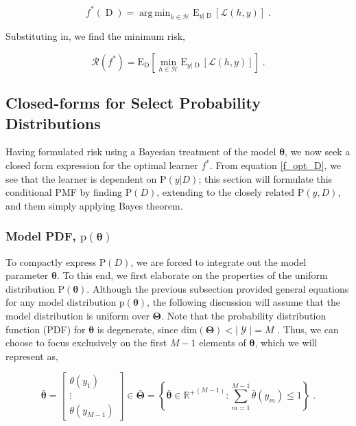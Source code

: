 \documentclass[12pt]{report}
\DeclareMathOperator*{\argmin}{arg\,min}
\DeclareMathOperator{\Drm}{\mathrm{D}}
\DeclareMathOperator{\Ycal}{\mathcal{Y}}
\begin{document}
\begin{equation} \label{f_opt_D}
f^*(\Drm) = \argmin_{h \in \mathcal{H}} \text{E}_{y|\Drm}\left[ \mathcal{L}(h,y) \right] \;.
\end{equation}

Substituting in, we find the minimum risk,

\begin{equation} \label{risk_min}
\mathcal{R}(f^*) = \text{E}_{\Drm} \left[ \min_{h \in \mathcal{H}} \text{E}_{y|\Drm}\left[ \mathcal{L}(h,y) \right] \right] \;.
\end{equation}




\subsection{Closed-forms for Select Probability Distributions}

Having formulated risk using a Bayesian treatment of the model $\bm{\theta}$, we now seek a closed form expression for the optimal learner $f^*$. From equation \eqref{f_opt_D}, we see that the learner is dependent on $\text{P}(y|D)$; this section will formulate this conditional PMF by finding $\text{P}(D)$, extending to the closely related $\text{P}(y,D)$, and them simply applying Bayes theorem.


\subsubsection{Model PDF, $\text{p}(\bm{\theta})$}

To compactly express $\text{P}(D)$, we are forced to integrate out the model parameter $\bm{\theta}$. To this end, we first elaborate on the properties of the uniform distribution $\text{P}(\bm{\theta})$. Although the previous subsection provided general equations for any model distribution $\text{p}(\bm{\theta})$, the following discussion will assume that the model distribution is uniform over $\bm{\Theta}$. Note that the probability distribution function (PDF) for $\bm{\theta}$ is degenerate, since $\text{dim}(\bm{\Theta}) < |\Ycal| = M$ . Thus, we can choose to focus exclusively on the first $M-1$ elements of $\bm{\theta}$, which we will represent as,

\begin{equation}
\bar{\bm{\theta}} = \begin{bmatrix} \theta(y_1) \\ \vdots \\ \theta(y_{M-1}) \end{bmatrix} \in \bar{\bm{\Theta}} = \left\{ \bar{\bm{\theta}} \in {\mathbb{R}^+}^{(M-1)}: \sum_{m=1}^{M-1} \bar{\theta}(y_m) \leq 1 \right\} \;.
\end{equation}
\end{document}
